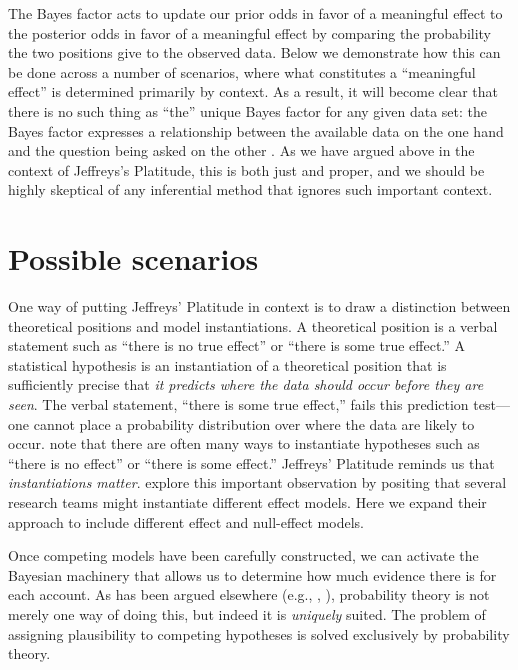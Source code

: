 The Bayes factor acts to update our prior odds in favor of a meaningful effect to the posterior odds in favor of a meaningful effect by comparing the probability the two positions give to the observed data. Below we demonstrate how this can be done across a number of scenarios, where what constitutes a ``meaningful effect'' is determined primarily by context. As a result, it will become clear that there is no such thing as ``the'' unique Bayes factor for any given data set: the Bayes factor expresses a relationship between the available data on the one hand and the question being asked on the other \cite{morey2011bayes}.  As we have argued above in the context of Jeffreys's Platitude, this is both just and proper, and we should 
be highly skeptical of any inferential method that ignores such important context.

\section*{Possible scenarios}

One way of putting Jeffreys' Platitude in context is to draw a distinction between theoretical positions and model instantiations.  A theoretical position is a verbal statement such as ``there is no true effect'' or ``there is some true effect.''   A statistical hypothesis is an instantiation of a theoretical position that is sufficiently precise that \emph{it predicts where the data should occur before they are seen}.  The verbal statement, ``there is some true effect,'' fails this prediction test---one cannot place a probability distribution over where the data are likely to occur.    note that there are often many ways to instantiate hypotheses such as ``there is no effect'' or ``there is some effect.''  Jeffreys' Platitude reminds us that \emph{instantiations matter}.   explore this important observation by positing that several research teams might instantiate different effect models.  Here we expand their approach to include different effect and null-effect models.

Once competing models have been carefully constructed, we can activate the Bayesian machinery that allows us to determine how much evidence there is for each account. As has been argued elsewhere (e.g., , ), probability theory is not merely one way of doing this, but indeed it is \textit{uniquely} suited. {The problem of assigning plausibility to competing hypotheses is solved {exclusively} by probability theory}.

